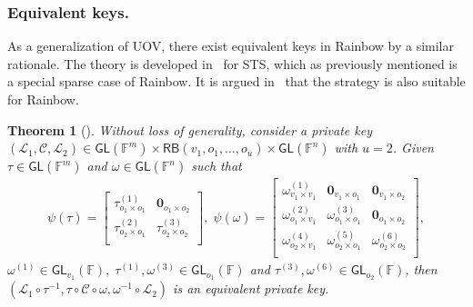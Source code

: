 \documentclass[12pt, a4paper, oneside]{memoir}
\newtheorem{theorem}{Theorem}[section]
\theoremstyle{definition}
\begin{document}
\subsubsection{Equivalent keys.}

As a generalization of UOV, there exist equivalent keys in Rainbow by a similar rationale. The theory is developed in~\cite[Section 4.4]{Wolf:201104} for STS, which as previously mentioned is a special sparse case of Rainbow. It is argued in~\cite{Petzoldt:201307} that the strategy is also suitable for Rainbow.

\begin{theorem}[{\cite[Theorem 4.17]{Wolf:201104}}]
  Without loss of generality, consider a private key $(\mathcal{L}_{1}, \mathcal{C}, \mathcal{L}_{2}) \in \mathsf{GL}(\mathbb{F}^{m}) \times \mathsf{RB}(v_{1}, o_{1}, \dots, o_{u}) \times \mathsf{GL}(\mathbb{F}^{n})$ with $u = 2$. Given $\tau \in \mathsf{GL}(\mathbb{F}^{m})$ and $\omega \in \mathsf{GL}(\mathbb{F}^{n})$ such that
  \begin{align}
    \psi(\tau) =
    \begin{bmatrix}
      \tau_{o_{1} \times o_{1}}^{(1)} & \mathbf{0}_{o_{1} \times o_{2}} \\
      \tau_{o_{2} \times o_{1}}^{(2)} & \tau_{o_{2} \times o_{2}}^{(3)} \\
    \end{bmatrix},\;
    \psi(\omega) =
    \begin{bmatrix}
      \omega_{v_{1} \times v_{1}}^{(1)} & \mathbf{0}_{v_{1} \times o_{1}}   & \mathbf{0}_{v_{1} \times o_{2}} \\
      \omega_{o_{1} \times v_{1}}^{(2)} & \omega_{o_{1} \times o_{1}}^{(3)} & \mathbf{0}_{o_{1} \times o_{2}} \\
      \omega_{o_{2} \times v_{1}}^{(4)} & \omega_{o_{2} \times o_{1}}^{(5)} & \omega_{o_{2} \times o_{2}}^{(6)} \\
    \end{bmatrix},
  \end{align}
  $\omega^{(1)} \in \mathsf{GL}_{v_{1}}(\mathbb{F}),\; \tau^{(1)}, \omega^{(3)} \in \mathsf{GL}_{o_{1}}(\mathbb{F})$ and $\tau^{(3)}, \omega^{(6)} \in \mathsf{GL}_{o_{2}}(\mathbb{F})$, then $(\mathcal{L}_{1} \circ \tau^{-1}, \tau \circ \mathcal{C} \circ \omega, \omega^{-1} \circ \mathcal{L}_{2})$ is an equivalent private key.
\end{theorem}
\end{document}
